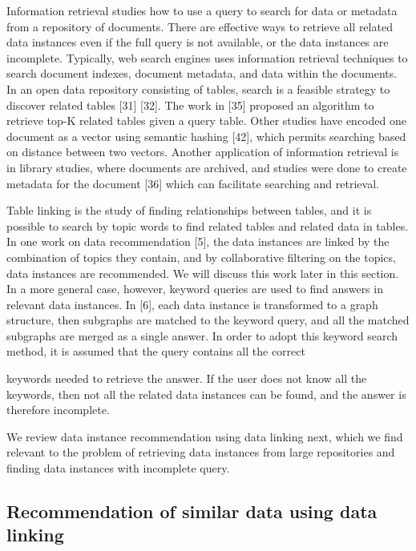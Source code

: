 Information retrieval studies how to use a query to search for data or metadata from a repository of documents. There are effective ways to retrieve all related data instances even if the full query is not available, or the data instances are incomplete. Typically, web search engines uses information retrieval techniques to search document indexes, document metadata, and data within the documents. In an open data repository consisting of tables, search is a feasible strategy to discover related tables [31] [32]. The work in [35] proposed an algorithm to retrieve top-K related tables given a query table. Other studies have encoded one document as a vector using semantic hashing [42], which permits searching based on distance between two vectors. Another application of information retrieval is in library studies, where documents are archived, and studies were done to create metadata for the document [36] which can facilitate searching and retrieval.

Table linking is the study of finding relationships between tables, and it is possible to search by topic words to find related tables and related data in tables. In one work on data recommendation [5], the data instances are linked by the combination of topics they contain, and by collaborative filtering on the topics, data instances are recommended. We will discuss this work later in this section. In a more general case, however, keyword queries are used to find answers in relevant data instances. In [6], each data instance is transformed to a graph structure, then subgraphs are matched to the keyword query, and all the matched subgraphs are merged as a single answer. In order to adopt this keyword search method, it is assumed that the query contains all the correct

keywords needed to retrieve the answer. If the user does not know all the keywords, then not all the related data instances can be found, and the answer is therefore incomplete.

We review data instance recommendation using data linking next, which we find relevant to the problem of retrieving data instances from large repositories and finding data instances with incomplete query.

\subsection{Recommendation of similar data using data linking}


